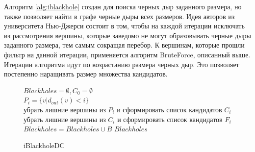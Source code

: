 \documentclass[12pt,a4paper,oneside,openany]{article}
\theoremstyle{definition}
\theoremstyle{lemma}
\theoremstyle{remark}
\begin{document}
Алгоритм \ref{alg:iblackhole} создан для поиска черных дыр заданного размера, но также позволяет найти в графе черные дыры всех размеров.
Идея авторов из университета Нью-Джерси состоит в том, чтобы на каждой итерации исключать из рассмотрения вершины, которые заведомо не могут
образовывать черные дыры заданного размера, тем самым сокращая перебор.
К вершинам, которые прошли фильтр на данной итерации, применяется алгоритм BruteForce, описанный выше.
Итерации алгоритма идут по возрастанию размера черных дыр. Это позволяет постепенно наращивать размер множества кандидатов.

\linespread{1.0}
\begin{figure}[H]
	\begin{center}
		\begin{algorithm}[H]
			\SetAlgoLined

                        $Blackholes = \emptyset, C_0 = \emptyset$ \\
                         {
                            $P_i = \{v | d_{out}(v) < i\}$ \\
                            убрать лишние вершины из $P_i$ и сформировать список кандидатов $C_i$ \\
                            убрать лишние вершины из $C_i$ и сформировать список кандидатов $F_i$ \\
                             {
                                 {
                                     {
                                         {
                                            $Blackholes = Blackholes \cup B$
                                        }
                                    }
                                }
                            }
                        }
                        \Return $Blackholes$
			\label{alg:iblackholedc}
			\caption{iBlackholeDC}
		\end{algorithm}
	\end{center}
\end{figure}
\linespread{1.5}
\end{document}
